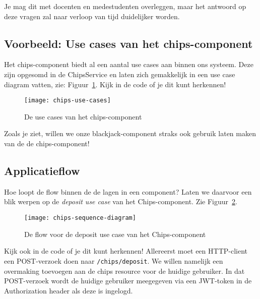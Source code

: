 Je mag dit met docenten en medestudenten overleggen, 
maar het antwoord op deze vragen zal naar verloop van tijd duidelijker worden.

\newpage
\subsection{Voorbeeld: Use cases van het chips-component}
Het chips-component biedt al een aantal use cases aan binnen ons systeem.
Deze zijn opgesomd in de ChipsService en laten zich gemakkelijk in een 
use case diagram vatten, zie: Figuur~\ref{fig:chips-use-cases}.
Kijk in de code of je dit kunt herkennen!

\begin{figure}[H]
    \centering
    \texttt{[image: chips-use-cases]}
    \caption{De use cases van het chips-component}
    \label{fig:chips-use-cases}
\end{figure}

Zoals je ziet, willen we onze blackjack-component straks 
ook gebruik laten maken van de de chips-component!

\newpage
\subsection{Applicatieflow}
Hoe loopt de flow binnen de de lagen in een component? 
Laten we daarvoor een blik werpen 
op de \emph{deposit use case} van het Chips-component.
Zie Figuur~\ref{fig:chips-sequence-diagram}.

\begin{figure}[H]
    \centering
    \texttt{[image: chips-sequence-diagram]}
    \caption{De flow voor de deposit use case van het Chips-component}
    \label{fig:chips-sequence-diagram}
\end{figure}

Kijk ook in de code of je dit kunt herkennen!
Allereerst moet een HTTP-client een POST-verzoek doen naar 
\texttt{/chips/deposit}. We willen namelijk een overmaking toevoegen
aan de chips resource voor de huidige gebruiker. In dat POST-verzoek 
wordt de huidige gebruiker meegegeven via een JWT-token in de Authorization header
als deze is ingelogd. 

